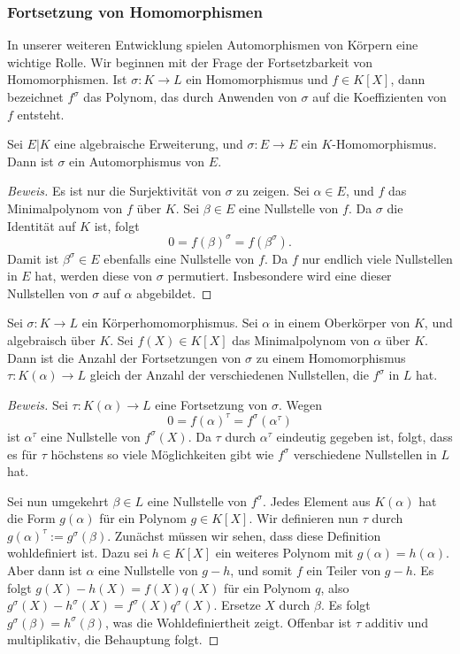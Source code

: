 \documentclass[12pt,a4paper,twoside]{article}
\begin{document}
\subsubsection{Fortsetzung von Homomorphismen}
In unserer weiteren Entwicklung spielen Automorphismen von K\"orpern eine
wichtige Rolle. Wir beginnen mit der Frage der Fortsetzbarkeit von
Homomorphismen. Ist $\sigma:K\to L$ ein Homomorphismus und $f\in K[X]$, dann
bezeichnet $f^\sigma$ das Polynom, das durch Anwenden von $\sigma$ auf die
Koeffizienten von $f$ entsteht.
\begin{Lemma}\label{L:injbij}
  Sei $E|K$ eine algebraische Erweiterung, und $\sigma:E\to E$ ein
  $K$-Homomorphismus. Dann ist $\sigma$ ein Automorphismus von $E$.
\end{Lemma}
\begin{proof}[Beweis]
Es ist nur die Surjektivit\"at von $\sigma$ zu zeigen. Sei $\alpha\in E$, und
$f$ das Minimalpolynom von $f$ \"uber $K$. Sei $\beta\in E$ eine Nullstelle
von $f$. Da $\sigma$ die Identit\"at auf $K$
ist, folgt
\[
0=f(\beta)^\sigma=f(\beta^\sigma).
\]
Damit ist $\beta^\sigma\in E$ ebenfalls eine Nullstelle von $f$. Da $f$ nur
endlich viele Nullstellen in $E$ hat, werden diese von $\sigma$ permutiert.
Insbesondere wird eine dieser Nullstellen von $\sigma$ auf $\alpha$
abgebildet.
\end{proof}
\begin{Lemma}\label{L:Fortssep}
  Sei $\sigma:K\to L$ ein K\"orperhomomorphismus. Sei $\alpha$ in einem
  Oberk\"orper von $K$, und algebraisch \"uber $K$. Sei $f(X)\in K[X]$ das
  Minimalpolynom von $\alpha$ \"uber $K$. Dann ist die Anzahl der
  Fortsetzungen von $\sigma$ zu einem Homomorphismus $\tau:K(\alpha)\to L$
  gleich der Anzahl der verschiedenen Nullstellen, die $f^\sigma$ in $L$ hat.
\end{Lemma}
\begin{proof}[Beweis]
  Sei $\tau:K(\alpha)\to L$ eine Fortsetzung von $\sigma$.  Wegen
\[
0=f(\alpha)^\tau=f^\sigma(\alpha^\tau)
\]
ist $\alpha^\tau$ eine Nullstelle von $f^\sigma(X)$. Da $\tau$ durch
$\alpha^\tau$ eindeutig gegeben ist, folgt, dass es f\"ur $\tau$ h\"ochstens
so viele M\"oglichkeiten gibt wie $f^\sigma$ verschiedene Nullstellen in $L$
hat.

Sei nun umgekehrt $\beta\in L$ eine Nullstelle von $f^\sigma$. Jedes Element
aus $K(\alpha)$ hat die Form $g(\alpha)$ f\"ur ein Polynom $g\in K[X]$. Wir
definieren nun $\tau$ durch $g(\alpha)^\tau:=g^\sigma(\beta)$. Zun\"achst
m\"ussen wir sehen, dass diese Definition wohldefiniert ist. Dazu sei $h\in
K[X]$ ein weiteres Polynom mit $g(\alpha)=h(\alpha)$. Aber dann ist $\alpha$
eine Nullstelle von $g-h$, und somit $f$ ein Teiler von $g-h$. Es folgt
$g(X)-h(X)=f(X)q(X)$ f\"ur ein Polynom $q$, also
$g^\sigma(X)-h^\sigma(X)=f^\sigma(X)q^\sigma(X)$. Ersetze $X$ durch $\beta$.
Es folgt $g^\sigma(\beta)=h^\sigma(\beta)$, was die Wohldefiniertheit zeigt.
Offenbar ist $\tau$ additiv und multiplikativ, die Behauptung folgt.
\end{proof}
\end{document}
